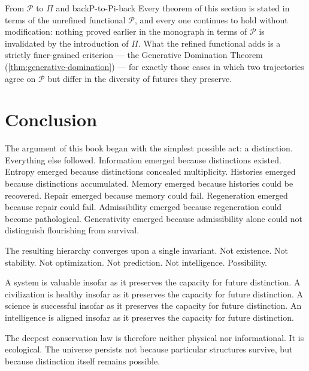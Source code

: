 \documentclass[12pt,twoside,openright]{book}
\begin{document}
\begin{remark}{From $\mathcal{P}$ to $\Pi$ and back}{P-to-Pi-back}
  Every theorem of this section is stated in terms of the
  unrefined functional $\mathcal{P}$, and every one continues
  to hold without modification: nothing proved earlier in
  the monograph in terms of $\mathcal{P}$ is invalidated by
  the introduction of $\Pi$. What the refined functional adds
  is a strictly finer-grained criterion --- the Generative
  Domination Theorem (\cref{thm:generative-domination}) ---
  for exactly those cases in which two trajectories agree on
  $\mathcal{P}$ but differ in the diversity of futures they
  preserve.
\end{remark}

\section{Conclusion}
\label{sec:ch31-conclusion}

The argument of this book began with the simplest possible
act: a distinction. Everything else followed. Information
emerged because distinctions existed. Entropy emerged
because distinctions concealed multiplicity. Histories
emerged because distinctions accumulated. Memory emerged
because histories could be recovered. Repair emerged because
memory could fail. Regeneration emerged because repair could
fail. Admissibility emerged because regeneration could
become pathological. Generativity emerged because
admissibility alone could not distinguish flourishing from
survival.

The resulting hierarchy converges upon a single invariant.
Not existence. Not stability. Not optimization. Not
prediction. Not intelligence. Possibility.

A system is valuable insofar as it preserves the capacity
for future distinction. A civilization is healthy insofar as
it preserves the capacity for future distinction. A science
is successful insofar as it preserves the capacity for
future distinction. An intelligence is aligned insofar as it
preserves the capacity for future distinction.

The deepest conservation law is therefore neither physical
nor informational. It is ecological. The universe persists
not because particular structures survive, but because
distinction itself remains possible.
\end{document}
